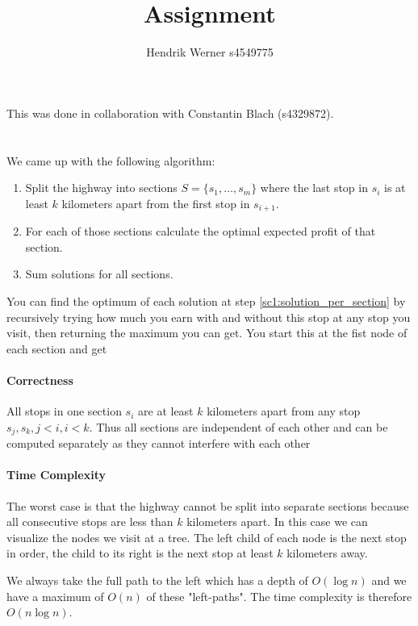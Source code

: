 \documentclass[12pt, a4paper]{article}
\title{Assignment}
\author{Hendrik Werner s4549775}
\begin{document}
\maketitle

This was done in collaboration with Constantin Blach (s4329872).

\section{} %
We came up with the following algorithm:

\begin{enumerate}
	\item Split the highway into sections $S = \{s_1, \dots, s_m\}$ where the last stop in $s_i$ is at least $k$ kilometers apart from the first stop in $s_{i + 1}$.
	\item For each of those sections calculate the optimal expected profit of that section.
	\label{sc1:solution_per_section}
	\item Sum solutions for all sections.
\end{enumerate}

You can find the optimum of each solution at step \ref{sc1:solution_per_section} by recursively trying how much you earn with and without this stop at any stop you visit, then returning the maximum you can get. You start this at the fist node of each section and get

\paragraph{Correctness}
All stops in one section $s_i$ are at least $k$ kilometers apart from any stop $s_j, s_k, j < i, i < k$. Thus all sections are independent of each other and can be computed separately as they cannot interfere with each other

\paragraph{Time Complexity}
The worst case is that the highway cannot be split into separate sections because all consecutive stops are less than $k$ kilometers apart. In this case we can visualize the nodes we visit at a tree. The left child of each node is the next stop in order, the child to its right is the next stop at least $k$ kilometers away.

We always take the full path to the left which has a depth of $O(\log n)$ and we have a maximum of $O(n)$ of these "left-paths". The time complexity is therefore $O(n \log n)$.
\end{document}
